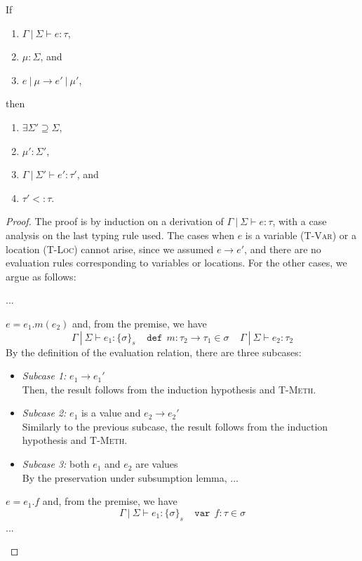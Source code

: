 \documentclass{llncs}
\newcommand{\keywadj}[1]{\mathtt{#1}}
\newcommand{\keyw}[1]{\keywadj{#1}~}
\newcommand{\pcase}[1][]{
  \if\relax\detokenize{#1}\relax
    \def\thiscase{}
  \else
    \def\thiscase{~#1}
  \fi
  \item
}
\begin{document}
\vspace{15pt}

\begin{theorem}[Preservation]
If
\begin{enumerate}
\item $\Gamma~|~\Sigma \vdash e : \tau$,
\item $\mu : \Sigma$, and
\item $e~|~\mu \longrightarrow e'~|~\mu'$,
\end{enumerate}
then
\begin{enumerate}
\item $\exists \Sigma' \supseteq \Sigma$,
\item $\mu' : \Sigma'$,
\item $\Gamma~|~\Sigma' \vdash e' : \tau'$, and
\item $\tau'<:\tau$.
\end{enumerate}

\end{theorem}

\begin{proof} The proof is by induction on a derivation of $\Gamma~|~\Sigma \vdash e : \tau$, with a case analysis on the last typing rule used. The cases when $e$ is a variable (\textsc{T-Var}) or a location (\textsc{T-Loc}) cannot arise, since we assumed $e \longrightarrow e'$, and there are no evaluation rules corresponding to variables or locations. For the other cases, we argue as follows:

\begin{pcases}
\pcase[\textsc{T-New}] ...
\\
\pcase[\textsc{T-Meth}]
$e = e_1.m(e_2)$ and, from the premise, we have
\[
\Gamma~|~\Sigma \vdash e_1 : \{\sigma\}_s~~~~~\keyw{def}~ m : \tau_2 \rightarrow \tau_1 \in \sigma~~~~~\Gamma~|~\Sigma \vdash e_2 : \tau_2
\]
By the definition of the evaluation relation, there are three subcases:
\\
\begin{itemize}
\item[]  \textit{Subcase 1:} $e_1 \longrightarrow e_1'$
\\
Then, the result follows from the induction hypothesis and \textsc{T-Meth}.
\\
\item[]  \textit{Subcase 2:} $e_1$ is a value and $e_2 \longrightarrow e_2'$
\\
Similarly to the previous subcase, the result follows from the induction hypothesis and \textsc{T-Meth}.
\\
\item[]  \textit{Subcase 3:} both $e_1$ and $e_2$ are values
\\
By the preservation under subsumption lemma, ...
\\
\end{itemize}

\pcase[\textsc{T-Field}]
$e = e_1.f$ and, from the premise, we have
\[
\Gamma~|~\Sigma \vdash e_1 : \{\sigma\}_s~~~~~\keyw{var}~ f : \tau \in \sigma
\]
...
\\
\end{pcases}

\end{proof}
\end{document}
